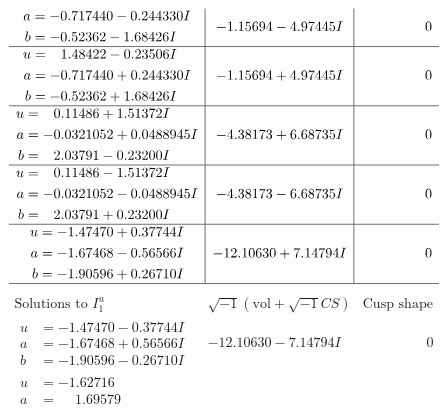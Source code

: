 \documentclass[1p]{elsarticle_modified}
\theoremstyle{definition}
\newcommand{\I}{\sqrt{-1}}
\begin{document}
$$\begin{array}{c|c|c}
\begin{aligned}
a &= -0.717440 - 0.244330 I \\
b &= -0.52362 - 1.68426 I\end{aligned}
 & -1.15694 - 4.97445 I & \phantom{-0.000000 } 0 \\ \hline\begin{aligned}
u &= \phantom{-}1.48422 - 0.23506 I \\
a &= -0.717440 + 0.244330 I \\
b &= -0.52362 + 1.68426 I\end{aligned}
 & -1.15694 + 4.97445 I & \phantom{-0.000000 } 0 \\ \hline\begin{aligned}
u &= \phantom{-}0.11486 + 1.51372 I \\
a &= -0.0321052 + 0.0488945 I \\
b &= \phantom{-}2.03791 - 0.23200 I\end{aligned}
 & -4.38173 + 6.68735 I & \phantom{-0.000000 } 0 \\ \hline\begin{aligned}
u &= \phantom{-}0.11486 - 1.51372 I \\
a &= -0.0321052 - 0.0488945 I \\
b &= \phantom{-}2.03791 + 0.23200 I\end{aligned}
 & -4.38173 - 6.68735 I & \phantom{-0.000000 } 0 \\ \hline\begin{aligned}
u &= -1.47470 + 0.37744 I \\
a &= -1.67468 - 0.56566 I \\
b &= -1.90596 + 0.26710 I\end{aligned}
 & -12.10630 + 7.14794 I & \phantom{-0.000000 } 0\\
 \hline 
 \end{array}$$\newpage$$\begin{array}{c|c|c}  
\text{Solutions to }I^u_{1}& \I (\text{vol} + \sqrt{-1}CS) & \text{Cusp shape}\\
 \hline 
\begin{aligned}
u &= -1.47470 - 0.37744 I \\
a &= -1.67468 + 0.56566 I \\
b &= -1.90596 - 0.26710 I\end{aligned}
 & -12.10630 - 7.14794 I & \phantom{-0.000000 } 0 \\ \hline\begin{aligned}
u &= -1.62716\phantom{ +0.000000I} \\
a &= \phantom{-}1.69579\phantom{ +0.000000I} \\

\end{aligned}
\end{array}$$
\end{document}
